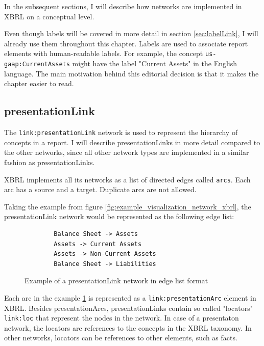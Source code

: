 In the subsequent sections, I will describe how networks are implemented in XBRL on a conceptual level. 

Even though labels will be covered in more detail in section \ref{sec:labelLink}, I will already use them throughout this chapter.
Labels are used to associate report elements with human-readable labels.
For example, the concept \texttt{us-gaap:CurrentAssets} might have the label "Current Assets" in the English language.
The main motivation behind this editorial decision is that it makes the chapter easier to read.



\subsection{presentationLink}

The \texttt{link:presentationLink} network is used to represent the hierarchy of concepts in a report.
I will describe presentationLinks in more detail compared to the other networks, 
since all other network types are implemented in a similar fashion as presentationLinks.

XBRL implements all its networks as a list of directed edges called \texttt{arcs}.
Each arc has a source and a target. Duplicate arcs are not allowed.

Taking the example from figure \ref{fig:example_visualization_network_xbrl}, the presentationLink network would be represented as the following edge list:

\begin{figure}[H]
    \caption{Example of a presentationLink network in edge list format}
    \label{fig:example_visualization_network_xbrl_edge_list}
    \begin{verbatim}
        Balance Sheet -> Assets
        Assets -> Current Assets
        Assets -> Non-Current Assets
        Balance Sheet -> Liabilities
    \end{verbatim}
\end{figure}

Each arc in the example \ref{fig:example_visualization_network_xbrl_edge_list} is represented as a \texttt{link:presentationArc} element in XBRL.
Besides presentationArcs, presentationLinks contain so called "locators" \texttt{link:loc} that represent the nodes in the network.
In case of a presentaton network, the locators are references to the concepts in the XBRL taxonomy. 
In other networks, locators can be references to other elements, such as facts.

